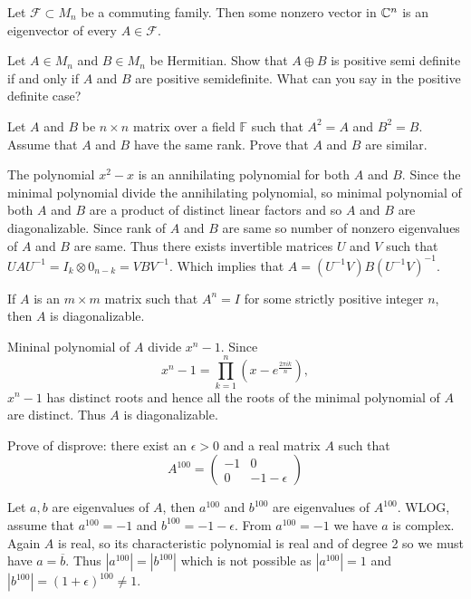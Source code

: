 \question Let $\mathcal{F}\subset M_n$ be a commuting family. Then some nonzero vector in $\mathbb{C}^n$ is an eigenvector of every $A\in\mathcal{F}$.

\question Let $A\in M_n$ and $B\in M_n$ be Hermitian. Show that $A\oplus B$ is positive semi definite if and only if $A$ and $B$ are positive semidefinite. What can you say in the positive definite case?

\question Let $A$ and $B$ be $n\times n$ matrix over a field $\mathbb{F}$ such that $A^2=A$ and $B^2=B$. Assume that $A$ and $B$ have the same rank. Prove that $A$ and $B$ are similar.

\begin{solution}
    The polynomial $x^2-x$ is an annihilating polynomial for both $A$ and $B$. Since the minimal polynomial divide the annihilating polynomial, so minimal polynomial of both $A$ and $B$ are a product of distinct linear factors and so $A$ and $B$ are diagonalizable. Since rank of $A$ and $B$ are same so number of nonzero eigenvalues of $A$ and $B$ are same. Thus there exists invertible matrices $U$ and $V$ such that $UAU^{-1}=I_k\otimes 0_{n-k}=VBV^{-1}$. Which implies that $A=(U^{-1}V)B(U^{-1}V)^{-1}$.
\end{solution}

\question If $A$ is an $m\times m$ matrix such that $A^n=I$ for some strictly positive integer $n$, then $A$ is diagonalizable.

\begin{solution}
    Mininal polynomial of $A$ divide $x^n-1$. Since $$x^n-1=\prod_{k=1}^{n}{\left(x-e^{\frac{2\pi ik}{n}}\right)},$$
    $x^n-1$ has distinct roots and hence all the roots of the minimal polynomial of $A$ are distinct. Thus $A$ is diagonalizable.
\end{solution}

\question[6A, Sp16] Prove of disprove: there exist an $\epsilon>0$ and a real matrix $A$ such that $$A^{100}=\begin{pmatrix}
    -1 & 0\\
    0 & -1-\epsilon
\end{pmatrix}$$
\begin{solution}
    Let $a,b$ are eigenvalues of $A$, then $a^{100}$ and $b^{100}$ are eigenvalues of $A^{100}$. WLOG, assume that $a^{100}=-1$ and $b^{100}=-1-\epsilon$. From $a^{100}=-1$ we have $a$ is complex. Again $A$ is real, so its characteristic polynomial is real and of degree 2 so we must have $a=\overline{b}$. Thus $|a^{100}|=|b^{100}|$ which is not possible as $|a^{100}|=1$ and $|b^{100}|=(1+\epsilon)^{100}\neq 1$.
\end{solution}

